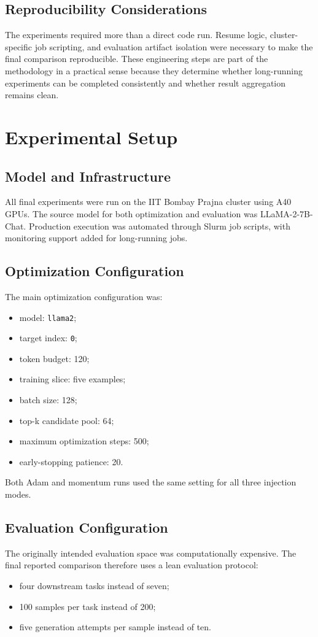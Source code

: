 \documentclass[12pt,a4paper]{report}
\begin{document}
\section{Reproducibility Considerations}
The experiments required more than a direct code run. Resume logic, cluster-specific job scripting, and evaluation artifact isolation were necessary to make the final comparison reproducible. These engineering steps are part of the methodology in a practical sense because they determine whether long-running experiments can be completed consistently and whether result aggregation remains clean.

\chapter{Experimental Setup}
\section{Model and Infrastructure}
All final experiments were run on the IIT Bombay Prajna cluster using A40 GPUs. The source model for both optimization and evaluation was LLaMA-2-7B-Chat. Production execution was automated through Slurm job scripts, with monitoring support added for long-running jobs.

\section{Optimization Configuration}
The main optimization configuration was:
\begin{itemize}
\item model: \texttt{llama2};
\item target index: \texttt{0};
\item token budget: 120;
\item training slice: five examples;
\item batch size: 128;
\item top-k candidate pool: 64;
\item maximum optimization steps: 500;
\item early-stopping patience: 20.
\end{itemize}

Both Adam and momentum runs used the same setting for all three injection modes.

\section{Evaluation Configuration}
The originally intended evaluation space was computationally expensive. The final reported comparison therefore uses a lean evaluation protocol:
\begin{itemize}
\item four downstream tasks instead of seven;
\item 100 samples per task instead of 200;
\item five generation attempts per sample instead of ten.
\end{itemize}
\end{document}
